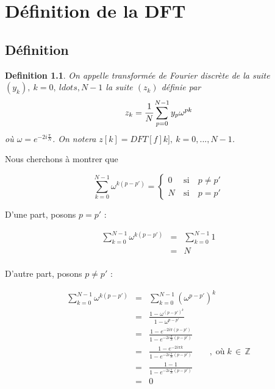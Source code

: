 \documentclass[a4paper,12pt]{report}
\newtheorem{definition}{Definition}
\begin{document}
\newpage
\null
\newpage
\tableofcontents


\chapter{D\'efinition de la DFT}

	\section{D\'efinition}

	\begin{definition}
		On appelle transform\'ee de Fourier discr\`ete de la suite $(y_k),~k=0,~ldots,N-1$ la suite $(z_k)$ d\'efinie par 
		$$
		z_k=\cfrac{1}{N}\sum_{p=0}^{N-1}y_p\omega^{pk}
		$$
		o\`u $\omega=e^{-2i\frac{\pi}{N}}$. On notera $z[k]=DFT[f]k],~k=0,...,N-1$.
	\end{definition}

	Nous cherchons \`a montrer que

	\begin{equation}
		\sum_{k=0}^{N-1}\omega^{k(p-p')}=\left\{\begin{array}{lll} 0 &~\text{si}~&p\neq p'\\N&~\text{si}~&p=p'\end{array}\right.
		\label{11}
	\end{equation}

	D'une part, posons $p=p'$ :

	\begin{eqnarray*}
		\sum_{k=0}^{N-1}\omega^{k(p-p')}&=&\sum_{k=0}^{N-1}1\\
		&=&N\\
	\end{eqnarray*}

	D'autre part, posons $p\neq p'$ : 

	\begin{eqnarray*}
		\sum_{k=0}^{N-1}\omega^{k(p-p')}&=&\sum_{k=0}^{N-1}(\omega^{p-p'})^{k}\\
		&=&\frac{1-\omega^{(p-p')^{k}}}{1-\omega^{p-p'}}\\
		&=&\frac{1-e^{-2i\pi (p-p')}}{1-e^{-2i\frac{\pi}{N}(p-p')}}\\
		&=&\frac{1-e^{-2i\pi k}}{1-e^{-2i\frac{\pi}{N}(p-p')}}\qquad,\;\text{o\`u}\;k\,\in\,\pmb{\mathbb{Z}}\\
		&=&\frac{1-1}{1-e^{-2i\frac{\pi}{N}(p-p')}}\\
		&=&0\\
	\end{eqnarray*}
\end{document}
